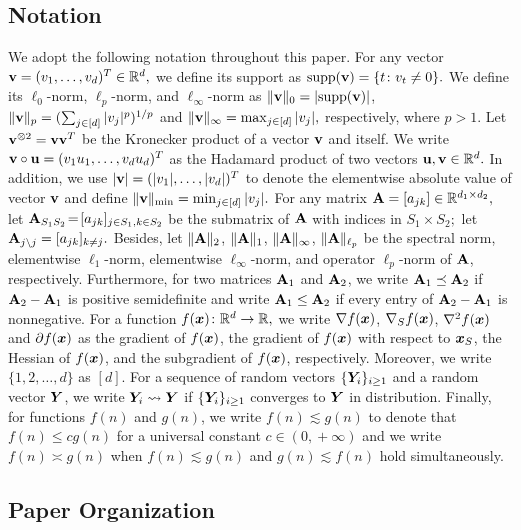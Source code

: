 \documentclass[twoside,11pt]{article}
\newcommand*{\BR}{\mathbb{R}}
\begin{document}
\subsection{Notation}
We adopt the following notation throughout this paper.
 For any vector $\vb = (v_1, \ldots, v_d)^T \in\BR^d,$  we define its support as  $\text{supp}(\mathbf{v}) = \{ t\colon v_t \neq 0\}.$ 
 We define its $\ell_0$-norm, $\ell_p$-norm, and $\ell_\infty$-norm as $\|\mathbf{v}\|_0 =   |\text{supp}(\mathbf{v}) |$, $\|\mathbf{v}\|_p  =  (\sum_{j \in[d]} |v_j|^p )^{1/p}$ and $\| \mathbf{v}\|_\infty =  \max_{j \in[d]} |v_j|,$ respectively, where $p > 1$. 
Let  $\mathbf{v}^{\otimes 2}  =  \mathbf{v} \mathbf{v}^T$ be the Kronecker product of a vector $\mathbf{v}$ and itself. We write $\mathbf{v} \circ \mathbf{u} = (v_1 u_1, \ldots, v_d u_d)^T$  as  the Hadamard product of two vectors $\ub, \vb\in \BR^d.$ 
In addition, we use $|\mathbf{v}|    =(|v_1|,\ldots,|v_d|)^T$ to denote the elementwise absolute value of vector $\mathbf{v}$ and define  $\|\mathbf{v}\|_{\min} = \min_{j\in[d]} |v_j|.$
For any matrix $\Ab =  [a_{jk}]  \in  \BR^{d_1 \times d_2},$ let $\mathbf{A}_{S_1 S_2} \!=\! [a_{jk }]_{j\in S_1, k\in S_2}$ be the submatrix of $\mathbf{A}$ with indices in $S_1 \times  S_2;$  let $\mathbf{A}_{j \setminus j} = [a_{j k}]_{k\neq j}.$ 
Besides, let $\| \mathbf{A}\|_2$, $ \|\mathbf{A}\|_1$, $\|\mathbf{A}\|_\infty$, $\|\mathbf{A}\|_{\ell_p}$ be the spectral norm,  elementwise $\ell_1$-norm,  elementwise $\ell_{\infty}$-norm, and operator $\ell_p$-norm of $\mathbf{A}$,  respectively.
 Furthermore, for two matrices $\mathbf{A}_1$ and $\mathbf{A}_2$, we write  $\mathbf{A}_1  \preceq  \mathbf{A}_2$ if $\mathbf{A}_2  -  \mathbf{A}_1$ is positive semidefinite and  write $\mathbf{A}_1  \leq \mathbf{A}_2$ if every entry of $\mathbf{A}_2 - \mathbf{A}_1$ is nonnegative. 
 For a function $f(\bx)\colon \BR^{d}\rightarrow \BR,$ we write $\nabla f(\bm{x})$,  $\nabla _S f(\bm{x})$, $\nabla^2 f(\bm{x})$ and $\partial f(\bm{x})$ as  the gradient of $f(\bm{x})$, the gradient of $f(\bm{x})$ with respect to $\bm{x}_S$, the Hessian of $f(\bm{x})$, and  the subgradient of $f(\bm{x}) $, respectively. 
 Moreover, we write  $   \{1,2,\ldots,d\}$ as $[d]$.   For a sequence of  random vectors $\{ \bm{Y}_i\}_{i\geq 1}$ and a random vector $\bm{Y}$,  we write $\bm{Y}_i \leadsto \bm{Y}$ if  $\{ \bm{Y}_i \}_{i\geq 1 }$  converges to   $\bm{Y}$  in distribution. Finally, for functions $f(n)$ and $g(n)$, we write $f(n)\lesssim g(n)$ to denote that $f(n) \!\leq\! cg(n)$ for a universal constant $c\!\in \! (0,\!+\!\infty)$ and we write $f(n) \asymp g(n)$ when $f(n)\lesssim g(n)$ and $g(n)\lesssim f(n)$ hold simultaneously.


\subsection{Paper Organization}
\end{document}
